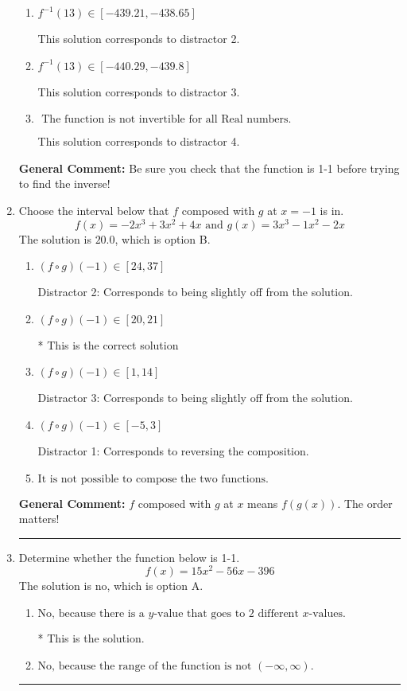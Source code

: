 \documentclass{extbook}[14pt]
\newcommand{\litem}[1]{\item #1

\rule{\textwidth}{0.4pt}}
\begin{document}
\begin{enumerate}
{\begin{enumerate}[label=\Alph*.]
 Distractor 1: This corresponds to 
\item \( f^{-1}(13) \in [-439.21, -438.65] \)

 This solution corresponds to distractor 2.
\item \( f^{-1}(13) \in [-440.29, -439.8] \)

 This solution corresponds to distractor 3.
\item \( \text{ The function is not invertible for all Real numbers. } \)

 This solution corresponds to distractor 4.
\end{enumerate}

\textbf{General Comment:} Be sure you check that the function is 1-1 before trying to find the inverse!
}
\litem{
Choose the interval below that $f$ composed with $g$ at $x=-1$ is in.
\[ f(x) = -2x^{3} +3 x^{2} +4 x \text{ and } g(x) = 3x^{3} -1 x^{2} -2 x \]The solution is \( 20.0 \), which is option B.\begin{enumerate}[label=\Alph*.]
\item \( (f \circ g)(-1) \in [24, 37] \)

 Distractor 2: Corresponds to being slightly off from the solution.
\item \( (f \circ g)(-1) \in [20, 21] \)

* This is the correct solution
\item \( (f \circ g)(-1) \in [1, 14] \)

 Distractor 3: Corresponds to being slightly off from the solution.
\item \( (f \circ g)(-1) \in [-5, 3] \)

 Distractor 1: Corresponds to reversing the composition.
\item \( \text{It is not possible to compose the two functions.} \)


\end{enumerate}

\textbf{General Comment:} $f$ composed with $g$ at $x$ means $f(g(x))$. The order matters!
}
\litem{
Determine whether the function below is 1-1.
\[ f(x) = 15 x^2 - 56 x - 396 \]The solution is \( \text{no} \), which is option A.\begin{enumerate}[label=\Alph*.]
\item \( \text{No, because there is a $y$-value that goes to 2 different $x$-values.} \)

* This is the solution.
\item \( \text{No, because the range of the function is not $(-\infty, \infty)$.} \)


\end{enumerate}}
\end{enumerate}
\end{document}
